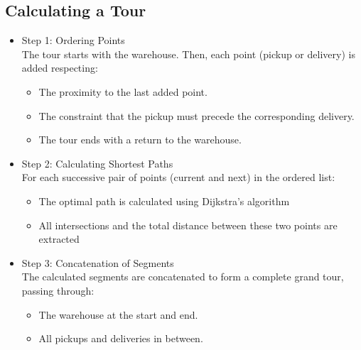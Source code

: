 \documentclass[a4paper]{article}
\begin{document}
\subsection{Calculating a Tour}
\begin{itemize}
    \item Step 1: Ordering Points \\
    The tour starts with the warehouse. Then, each point (pickup or delivery) is added respecting:
    \begin{itemize}
        \item The proximity to the last added point.
        \item The constraint that the pickup must precede the corresponding delivery.
        \item The tour ends with a return to the warehouse.
    \end{itemize}

    \item Step 2: Calculating Shortest Paths \\
    For each successive pair of points (current and next) in the ordered list:
    \begin{itemize}
        \item The optimal path is calculated using Dijkstra's algorithm
        \item All intersections and the total distance between these two points are extracted
    \end{itemize}
    \item Step 3: Concatenation of Segments \\
    The calculated segments are concatenated to form a complete grand tour, passing through:
    \begin{itemize}
        \item The warehouse at the start and end.
        \item All pickups and deliveries in between.
    \end{itemize}
\end{itemize}
\end{document}
